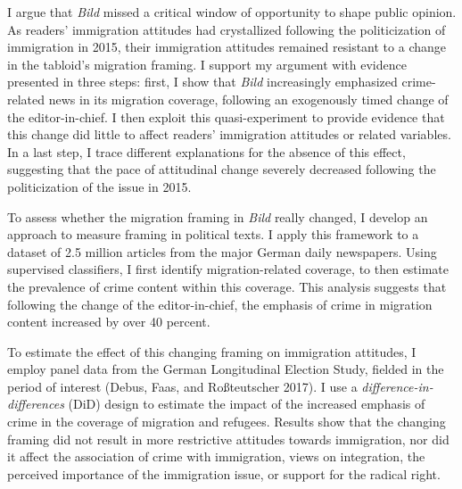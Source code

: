 \documentclass[
  12pt,
]{article}
\begin{document}
I argue that \emph{Bild} missed a critical window of opportunity to shape public opinion. As readers' immigration attitudes had crystallized following the politicization of immigration in 2015, their immigration attitudes remained resistant to a change in the tabloid's migration framing. I support my argument with evidence presented in three steps: first, I show that \emph{Bild} increasingly emphasized crime-related news in its migration coverage, following an exogenously timed change of the editor-in-chief. I then exploit this quasi-experiment to provide evidence that this change did little to affect readers' immigration attitudes or related variables. In a last step, I trace different explanations for the absence of this effect, suggesting that the pace of attitudinal change severely decreased following the politicization of the issue in 2015.

To assess whether the migration framing in \emph{Bild} really changed, I develop an approach to measure framing in political texts. I apply this framework to a dataset of 2.5 million articles from the major German daily newspapers. Using supervised classifiers, I first identify migration-related coverage, to then estimate the prevalence of crime content within this coverage. This analysis suggests that following the change of the editor-in-chief, the emphasis of crime in migration content increased by over 40 percent.

To estimate the effect of this changing framing on immigration attitudes, I employ panel data from the German Longitudinal Election Study, fielded in the period of interest (Debus, Faas, and Roßteutscher 2017). I use a \emph{difference-in-differences} (DiD) design to estimate the impact of the increased emphasis of crime in the coverage of migration and refugees. Results show that the changing framing did not result in more restrictive attitudes towards immigration, nor did it affect the association of crime with immigration, views on integration, the perceived importance of the immigration issue, or support for the radical right.
\end{document}

